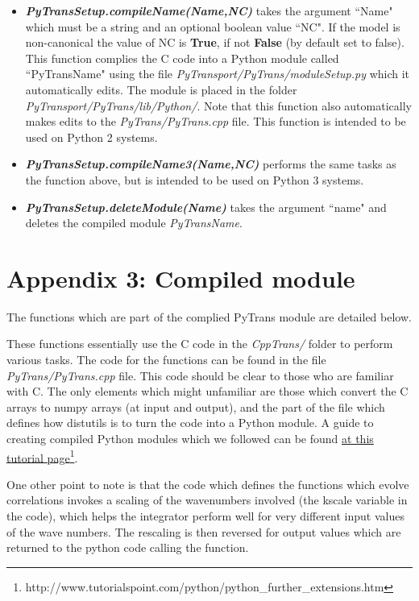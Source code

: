 \documentclass[10pt,
amsmath,amssymb,
aps,prd,nofootinbib,eqsecnum,a4paper]{revtex4}
\newcommand{\CC}{C\nolinebreak\hspace{-.05em}\raisebox{.4ex}{\tiny\bf +}\nolinebreak\hspace{-.10em}\raisebox{.4ex}{\tiny\bf +}}
\def\CC{{C\nolinebreak[4]\hspace{-.05em}\raisebox{.4ex}{\tiny\bf ++}}}
\def\S{ }
\begin{document}
\begin{itemize}
\item {\it \bf PyTransSetup.compileName(Name,NC)} takes the argument ``Name" which must be a string and an optional boolean value ``NC". If the model is non-canonical the value of NC is {\color{blue}\bf{True}}, if not {\color{blue}\bf{False}} (by default set to false). This function complies the \CC \S  code into a Python module called ``{PyTransName}" using the file {\it PyTransport/PyTrans/moduleSetup.py} which it automatically edits. The module is placed in the folder {\it PyTransport/PyTrans/lib/Python/}. Note that this function also automatically makes edits to the {\it PyTrans/PyTrans.cpp} file. This function is intended to be used on Python 2 systems.

\item {\it \bf PyTransSetup.compileName3(Name,NC)} performs the same tasks as the function above, but 
is intended to be used on Python 3 systems.


\item {\it \bf PyTransSetup.deleteModule(Name)} takes the argument ``name" and deletes the compiled module {\it PyTransName}.
\end{itemize}

\section*{Appendix 3: Compiled module }

The functions which are part of the complied PyTrans module are detailed below. 

These functions essentially use the \CC \S  code in the {\it CppTrans/} folder to perform various tasks. 
The code for the functions can be found in the file {\it PyTrans/PyTrans.cpp} file. This code 
should be clear to those who are familiar with \CC. The only elements which might unfamiliar are those which 
convert the \CC \S  arrays to numpy arrays (at input and output), and the part of the file which defines how distutils 
is to turn the code into a Python module. A guide to creating compiled Python modules which we followed can be found \href{http://www.tutorialspoint.com/python/python_further_extensions.htm}{at this tutorial page}\footnote{\rm http://www.tutorialspoint.com/python/python\_further\_extensions.htm}.

One other point to note is that the code which defines the functions which evolve correlations 
invokes a scaling of the wavenumbers involved (the kscale variable in the code), 
which helps the integrator perform well for very different input values of the wave numbers. The rescaling is then reversed 
for output values which are returned to the python code calling the function.
\end{document}
